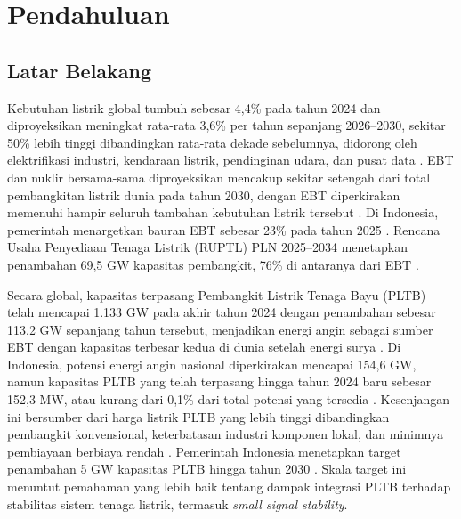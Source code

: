 \chapter{Pendahuluan}

\section{Latar Belakang}

Kebutuhan listrik global tumbuh sebesar 4,4\% pada tahun 2024 dan diproyeksikan
meningkat rata-rata 3,6\% per tahun sepanjang 2026--2030, sekitar 50\% lebih
tinggi dibandingkan rata-rata dekade sebelumnya, didorong oleh elektrifikasi
industri, kendaraan listrik, pendinginan udara, dan pusat data
\cite{iea2026electricity}. EBT dan nuklir bersama-sama diproyeksikan mencakup
sekitar setengah dari total pembangkitan listrik dunia pada tahun 2030, dengan
EBT diperkirakan memenuhi hampir seluruh tambahan kebutuhan listrik tersebut
\cite{iea2026electricity}. Di Indonesia, pemerintah menargetkan bauran EBT
sebesar 23\% pada tahun 2025 \cite{iea2022indonesia}. Rencana Usaha Penyediaan
Tenaga Listrik (RUPTL) PLN 2025--2034 menetapkan penambahan 69,5 GW kapasitas
pembangkit, 76\% di antaranya dari EBT \cite{ruptl2025}.

Secara global, kapasitas terpasang Pembangkit Listrik Tenaga Bayu (PLTB) telah
mencapai 1.133 GW pada akhir tahun 2024 dengan penambahan sebesar 113,2 GW
sepanjang tahun tersebut, menjadikan energi angin sebagai sumber EBT dengan
kapasitas terbesar kedua di dunia setelah energi surya \cite{irena2025capacity}.
Di Indonesia, potensi energi angin nasional diperkirakan mencapai 154,6 GW,
namun kapasitas PLTB yang telah terpasang hingga tahun 2024 baru sebesar 152,3
MW, atau kurang dari 0,1\% dari total potensi yang tersedia
\cite{esdm2025pltb,pambudi2025wind}. Kesenjangan ini bersumber dari harga
listrik PLTB yang lebih tinggi dibandingkan pembangkit konvensional,
keterbatasan industri komponen lokal, dan minimnya pembiayaan berbiaya rendah
\cite{pambudi2025wind}. Pemerintah Indonesia menetapkan target penambahan 5 GW
kapasitas PLTB hingga tahun 2030 \cite{esdm2025pltb}. Skala target ini menuntut
pemahaman yang lebih baik tentang dampak integrasi PLTB terhadap stabilitas
sistem tenaga listrik, termasuk \textit{small signal stability}.

